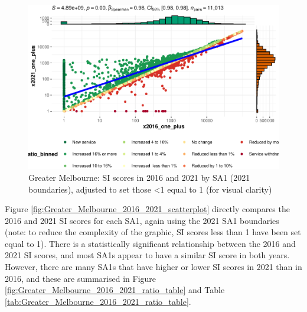 \documentclass[preprint, 3p,
authoryear]{elsarticle} %
\begin{document}
\begin{figure}
\centering
\includegraphics{Leveraging_GTFS_to_assess_transit_supply_Transport_Geography_files/figure-latex/Greater_Melbourne_2016_2021_scatterplot-1.pdf}
\caption{Greater Melbourne: SI scores in 2016 and 2021 by SA1 (2021
boundaries), adjusted to set those \textless1 equal to 1 (for visual
clarity)}
\end{figure}

Figure \ref{fig:Greater_Melbourne_2016_2021_scatterplot} directly
compares the 2016 and 2021 SI scores for each SA1, again using the 2021
SA1 boundaries (note: to reduce the complexity of the graphic, SI scores
less than 1 have been set equal to 1). There is a statistically
significant relationship between the 2016 and 2021 SI scores, and most
SA1s appear to have a similar SI score in both years. However, there are
many SA1s that have higher or lower SI scores in 2021 than in 2016, and
these are summarised in Figure
\ref{fig:Greater_Melbourne_2016_2021_ratio_table} and Table
\ref{tab:Greater_Melbourne_2016_2021_ratio_table}.
\end{document}
